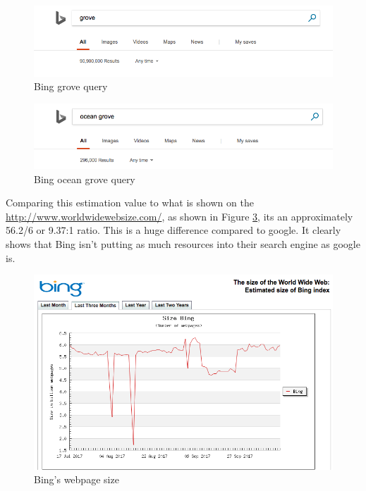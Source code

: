 \documentclass[letterpaper,11pt]{article}
\begin{document}
\begin{figure}[h]
\centering
\includegraphics[scale=0.4]{bing2.png}
\caption{Bing grove query}
\label{fig:q3b2}
\end{figure}

\begin{figure}[h]
\centering
\includegraphics[scale=0.4]{bing3.png}
\caption{Bing ocean grove query}
\label{fig:q3b3}
\end{figure}


Comparing this estimation value to what is shown on the \url{http://www.worldwidewebsize.com/}, as shown in Figure \ref{fig:q3bwww}, its an approximately 56.2/6 or 
9.37:1 ratio. 
This is a huge difference compared to google.  
It clearly shows that Bing isn't putting as much resources into their search engine as google is.
  
\begin{figure}[h]
\centering
\includegraphics[scale=0.4]{bingwww.png}
\caption{Bing's webpage size}
\label{fig:q3bwww}
\end{figure}
\end{document}
